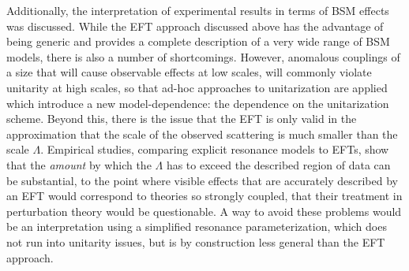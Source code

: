 Additionally, the interpretation of experimental results in terms of BSM effects was discussed. While the EFT approach discussed above has the advantage of being generic and provides a complete description of a very wide range of BSM models, there is also a number of shortcomings. However, anomalous couplings of a size that will cause observable effects at low scales, will  commonly violate unitarity at high scales, so that ad-hoc approaches to unitarization are applied which introduce a new model-dependence: the dependence on the unitarization scheme.
Beyond this, there is the issue that the EFT is only valid in the approximation that the scale of the observed scattering is much smaller than the scale $\Lambda$. Empirical studies, comparing explicit resonance models to EFTs, show that the \textit{amount} by which the $\Lambda$ has to exceed the described region of data can be substantial, to the point where visible effects that are accurately described by an EFT would correspond to theories so strongly coupled, that their treatment in perturbation theory would be questionable. A way to avoid these problems would be an interpretation using a simplified resonance parameterization, which does not run into unitarity issues, but is by construction less general than the EFT approach.



